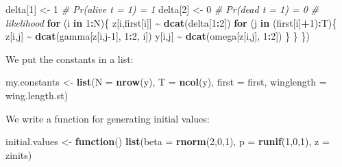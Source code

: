 \documentclass[
  12pt,
]{krantz}
\newenvironment{Shaded}{\begin{snugshade}}{\end{snugshade}}
\newcommand{\AttributeTok}[1]{\textcolor[rgb]{0.13,0.29,0.53}{#1}}
\newcommand{\CommentTok}[1]{\textcolor[rgb]{0.56,0.35,0.01}{\textit{#1}}}
\newcommand{\ControlFlowTok}[1]{\textcolor[rgb]{0.13,0.29,0.53}{\textbf{#1}}}
\newcommand{\DecValTok}[1]{\textcolor[rgb]{0.00,0.00,0.81}{#1}}
\newcommand{\FunctionTok}[1]{\textcolor[rgb]{0.13,0.29,0.53}{\textbf{#1}}}
\newcommand{\NormalTok}[1]{#1}
\newcommand{\OtherTok}[1]{\textcolor[rgb]{0.56,0.35,0.01}{#1}}
\newcommand{\SpecialCharTok}[1]{\textcolor[rgb]{0.81,0.36,0.00}{\textbf{#1}}}
\begin{document}
\begin{Shaded}
\begin{Highlighting}[]
\NormalTok{  delta[}\DecValTok{1}\NormalTok{] }\OtherTok{\textless{}{-}} \DecValTok{1}          \CommentTok{\# Pr(alive t = 1) = 1}
\NormalTok{  delta[}\DecValTok{2}\NormalTok{] }\OtherTok{\textless{}{-}} \DecValTok{0}          \CommentTok{\# Pr(dead t = 1) = 0}
  \CommentTok{\# likelihood}
  \ControlFlowTok{for}\NormalTok{ (i }\ControlFlowTok{in} \DecValTok{1}\SpecialCharTok{:}\NormalTok{N)\{}
\NormalTok{    z[i,first[i]] }\SpecialCharTok{\textasciitilde{}} \FunctionTok{dcat}\NormalTok{(delta[}\DecValTok{1}\SpecialCharTok{:}\DecValTok{2}\NormalTok{])}
    \ControlFlowTok{for}\NormalTok{ (j }\ControlFlowTok{in}\NormalTok{ (first[i]}\SpecialCharTok{+}\DecValTok{1}\NormalTok{)}\SpecialCharTok{:}\NormalTok{T)\{}
\NormalTok{      z[i,j] }\SpecialCharTok{\textasciitilde{}} \FunctionTok{dcat}\NormalTok{(gamma[z[i,j}\DecValTok{{-}1}\NormalTok{], }\DecValTok{1}\SpecialCharTok{:}\DecValTok{2}\NormalTok{, i])}
\NormalTok{      y[i,j] }\SpecialCharTok{\textasciitilde{}} \FunctionTok{dcat}\NormalTok{(omega[z[i,j], }\DecValTok{1}\SpecialCharTok{:}\DecValTok{2}\NormalTok{])}
\NormalTok{    \}}
\NormalTok{  \}}
\NormalTok{\})}
\end{Highlighting}
\end{Shaded}

We put the constants in a list:

\begin{Shaded}
\begin{Highlighting}[]
\NormalTok{my.constants }\OtherTok{\textless{}{-}} \FunctionTok{list}\NormalTok{(}\AttributeTok{N =} \FunctionTok{nrow}\NormalTok{(y), }
                     \AttributeTok{T =} \FunctionTok{ncol}\NormalTok{(y), }
                     \AttributeTok{first =}\NormalTok{ first,}
                     \AttributeTok{winglength =}\NormalTok{ wing.length.st)}
\end{Highlighting}
\end{Shaded}

We write a function for generating initial values:

\begin{Shaded}
\begin{Highlighting}[]
\NormalTok{initial.values }\OtherTok{\textless{}{-}} \ControlFlowTok{function}\NormalTok{() }\FunctionTok{list}\NormalTok{(}\AttributeTok{beta =} \FunctionTok{rnorm}\NormalTok{(}\DecValTok{2}\NormalTok{,}\DecValTok{0}\NormalTok{,}\DecValTok{1}\NormalTok{),}
                                  \AttributeTok{p =} \FunctionTok{runif}\NormalTok{(}\DecValTok{1}\NormalTok{,}\DecValTok{0}\NormalTok{,}\DecValTok{1}\NormalTok{),}
                                  \AttributeTok{z =}\NormalTok{ zinits)}
\end{Highlighting}
\end{Shaded}
\end{document}
